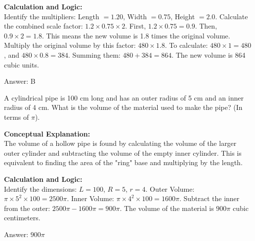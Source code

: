 \documentclass[11pt,paper=a4,answers]{exam}
\begin{document}
\begin{questions}
\begin{solution}
\vspace{30pt}

\textbf{Calculation and Logic:} \\
Identify the multipliers: Length $= 1.20$, Width $= 0.75$, Height $= 2.0$. Calculate the combined scale factor: $1.2 \times 0.75 \times 2$. First, $1.2 \times 0.75 = 0.9$. Then, $0.9 \times 2 = 1.8$. This means the new volume is 1.8 times the original volume. Multiply the original volume by this factor: $480 \times 1.8$. To calculate: $480 \times 1 = 480$, and $480 \times 0.8 = 384$. Summing them: $480 + 384 = 864$. The new volume is 864 cubic units.

\vspace{30pt}

Answer: \colorbox{yellow!100}{B}
\end{solution}

\vspace{60pt}

\question
A cylindrical pipe is 100 cm long and has an outer radius of 5 cm and an inner radius of 4 cm. What is the volume of the material used to make the pipe? (In terms of $\pi$).

\begin{solution}
\textbf{Conceptual Explanation:} \\
The volume of a hollow pipe is found by calculating the volume of the larger outer cylinder and subtracting the volume of the empty inner cylinder. This is equivalent to finding the area of the "ring" base and multiplying by the length.

\vspace{30pt}

\textbf{Calculation and Logic:} \\
Identify the dimensions: $L = 100$, $R = 5$, $r = 4$. Outer Volume: $\pi \times 5^2 \times 100 = 2500\pi$. Inner Volume: $\pi \times 4^2 \times 100 = 1600\pi$. Subtract the inner from the outer: $2500\pi - 1600\pi = 900\pi$. The volume of the material is $900\pi$ cubic centimeters.

\vspace{30pt}

Answer: \colorbox{yellow!100}{$900\pi$}
\end{solution}

\vspace{60pt}



\end{questions}
\end{document}
